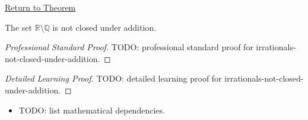 \newpage
{}
\label{prf:irrationals-not-closed-under-addition}

\begin{remark*}[Return]
\hyperref[cor:irrationals-not-closed-under-addition]{Return to Theorem}
\end{remark*}

\begin{corollary*}
The set $\mathbb{R}\setminus\mathbb{Q}$ is not closed under addition.
\end{corollary*}

\begin{proof}[Professional Standard Proof]
\LRAProofBodyStart
TODO: professional standard proof for irrationals-not-closed-under-addition.
\end{proof}

\begin{proof}[Detailed Learning Proof]
\LRAProofBodyStart
TODO: detailed learning proof for irrationals-not-closed-under-addition.
\end{proof}

\begin{remark*}
\end{remark*}

\begin{dependencies}
\begin{itemize}
  \item TODO: list mathematical dependencies.
\end{itemize}
\end{dependencies}

\clearpage
